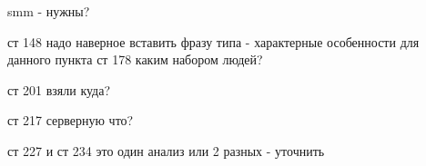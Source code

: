 

 
%

smm - нужны?


ст 148 надо наверное вставить фразу типа - характерные особенности для данного пункта
ст 178 каким набором людей?

ст 201 взяли куда?

ст 217 серверную что?

ст 227 и ст 234 это  один анализ или 2 разных - уточнить